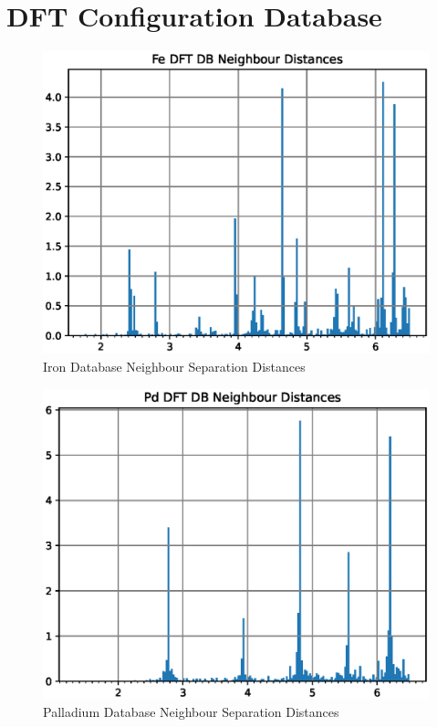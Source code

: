 \FloatBarrier










\FloatBarrier
\section{DFT Configuration Database}
\label{section:dftconfigurationdbresults}




\begin{figure}[htb]
\includegraphics[width=0.5\linewidth]{chapters/results_dft_reference_db/neighbour_distances/db_fe_neighbours.eps}
\caption{Iron Database Neighbour Separation Distances}
\label{fig:shengpdpair}
\end{figure}


\begin{figure}[htb]
\includegraphics[width=0.5\linewidth]{chapters/results_dft_reference_db/neighbour_distances/db_pd_neighbours.eps}
\caption{Palladium Database Neighbour Separation Distances}
\label{fig:shengpdpair}
\end{figure}


